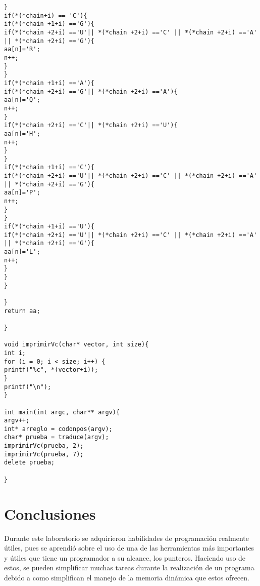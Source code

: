\documentclass[11pt]{article}
\begin{document}
\begin{lstlisting}
}
if(*(*chain+i) == 'C'){
if(*(*chain +1+i) =='G'){
if(*(*chain +2+i) =='U'|| *(*chain +2+i) =='C' || *(*chain +2+i) =='A' || *(*chain +2+i) =='G'){
aa[n]='R';
n++;
}	
}
if(*(*chain +1+i) =='A'){
if(*(*chain +2+i) =='G'|| *(*chain +2+i) =='A'){
aa[n]='Q';
n++;
}
if(*(*chain +2+i) =='C'|| *(*chain +2+i) =='U'){
aa[n]='H';
n++;
}
}
if(*(*chain +1+i) =='C'){
if(*(*chain +2+i) =='U'|| *(*chain +2+i) =='C' || *(*chain +2+i) =='A' || *(*chain +2+i) =='G'){
aa[n]='P';
n++;
}	
}
if(*(*chain +1+i) =='U'){
if(*(*chain +2+i) =='U'|| *(*chain +2+i) =='C' || *(*chain +2+i) =='A' || *(*chain +2+i) =='G'){
aa[n]='L';
n++;
}	
}	
}

}
return aa;

}

void imprimirVc(char* vector, int size){	
int i;
for (i = 0; i < size; i++) {
printf("%c", *(vector+i));		
}
printf("\n");
}

int main(int argc, char** argv){
argv++;
int* arreglo = codonpos(argv);
char* prueba = traduce(argv);
imprimirVc(prueba, 2); 
imprimirVc(prueba, 7);
delete prueba;

}
\end{lstlisting}


\section{Conclusiones}
Durante este laboratorio se adquirieron habilidades de programación realmente útiles, pues se aprendió sobre el uso de una de las herramientas más importantes y útiles que tiene un programador a su alcance, los punteros. Haciendo uso de estos, se pueden simplificar muchas tareas durante la realización de un programa debido a como simplifican el manejo de la memoria dinámica que estos ofrecen.
\end{document}
